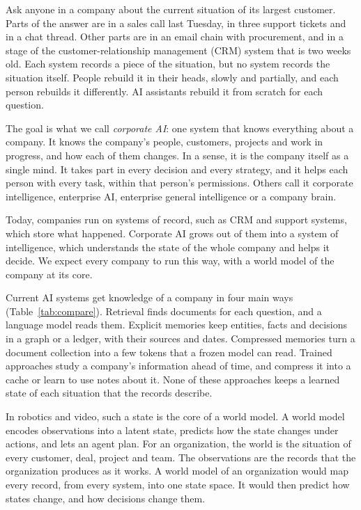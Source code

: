 \documentclass[11pt]{article}
\begin{document}
\medskip
Ask anyone in a company about the current situation of its largest customer. Parts of the answer are in a sales call last Tuesday, in three support tickets and in a chat thread. Other parts are in an email chain with procurement, and in a stage of the customer-relationship management (CRM) system that is two weeks old. Each system records a piece of the situation, but no system records the situation itself. People rebuild it in their heads, slowly and partially, and each person rebuilds it differently. AI assistants rebuild it from scratch for each question.

The goal is what we call \emph{corporate AI}: one system that knows everything about a company. It knows the company's people, customers, projects and work in progress, and how each of them changes. In a sense, it is the company itself as a single mind. It takes part in every decision and every strategy, and it helps each person with every task, within that person's permissions. Others call it corporate intelligence, enterprise AI, enterprise general intelligence or a company brain.

Today, companies run on systems of record, such as CRM and support systems, which store what happened. Corporate AI grows out of them into a system of intelligence, which understands the state of the whole company and helps it decide. We expect every company to run this way, with a world model of the company at its core.

Current AI systems get knowledge of a company in four main ways (Table~\ref{tab:compare}). Retrieval finds documents for each question, and a language model reads them\citep{lewis2020rag}. Explicit memories keep entities, facts and decisions in a graph or a ledger, with their sources and dates\citep{edge2024graphrag,packer2023memgpt,rasmussen2025zep,chhikara2025mem0}. Compressed memories turn a document collection into a few tokens that a frozen model can read\citep{fallahpour2026memorilla}. Trained approaches study a company's information ahead of time, and compress it into a cache or learn to use notes about it\citep{eyuboglu2025cartridges,engram2026notes}. None of these approaches keeps a learned state of each situation that the records describe.

In robotics and video, such a state is the core of a world model\citep{ha2018world,hafner2020dreamer,lecun2022path}. A world model encodes observations into a latent state, predicts how the state changes under actions, and lets an agent plan\citep{assran2025vjepa2,zhang2026hjepa}. For an organization, the world is the situation of every customer, deal, project and team. The observations are the records that the organization produces as it works. A world model of an organization would map every record, from every system, into one state space. It would then predict how states change, and how decisions change them.
\end{document}

